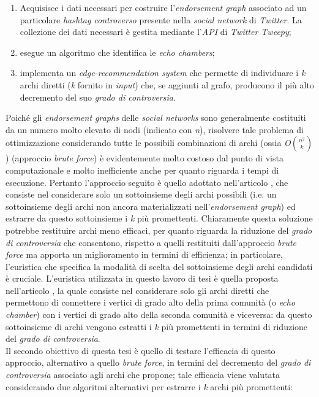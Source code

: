 \documentclass[trieste,12pt]{toptesi}
\begin{document}
\begin{enumerate}
\item Acquisisce i dati necessari per costruire l'\textit{endorsement graph} associato ad un particolare \textit{hashtag controverso} presente nella \textit{social network} di \textit{Twitter}. La collezione dei dati necessari è gestita mediante l'\textit{API} di \textit{Twitter Tweepy};
\item esegue un algoritmo che identifica le \textit{echo chambers};
\item implementa un \textit{edge-recommendation system} che permette di individuare i \textit{k} archi diretti (\textit{k} fornito in \textit{input}) che, se aggiunti al grafo, producono il più alto decremento del suo \textit{grado di controversia}. 
\end{enumerate}
Poiché gli \textit{endorsement graphs} delle \textit{social networks} sono generalmente costituiti da un numero molto elevato di nodi (indicato con \textit{n}), risolvere tale problema di ottimizzazione considerando tutte le possibili combinazioni di archi (ossia \textit{O}${n^2\choose k}$) (approccio \textit{brute force}) è evidentemente molto costoso dal punto di vista computazionale e molto inefficiente anche per quanto riguarda i tempi di esecuzione. Pertanto l'approccio seguito è quello adottato nell'articolo \cite{garimella:paper}, che consiste nel considerare solo un sottoinsieme degli archi possibili (i.e. un sottoinsieme degli archi non ancora materializzati nell'\textit{endorsement graph}) ed estrarre da questo sottoinsieme i \textit{k} più promettenti. Chiaramente questa soluzione potrebbe restituire archi meno efficaci, per quanto riguarda la riduzione del \textit{grado di controversia} che consentono, rispetto a quelli restituiti dall'approccio \textit{brute force} ma apporta un miglioramento in termini di efficienza; in particolare, l'euristica che specifica la modalità di scelta del sottoinsieme degli archi candidati è cruciale. L'euristica utilizzata in questo lavoro di tesi è quella proposta nell'articolo \cite{garimella:paper}, la quale
consiste nel considerare solo gli archi diretti che permettono di connettere i vertici di grado alto della prima comunità (o \textit{echo chamber}) con i vertici di grado alto della seconda comunità e viceversa: da questo sottoinsieme di archi vengono estratti i \textit{k} più promettenti in termini di riduzione del \textit{grado di controversia}.\\Il secondo obiettivo di questa tesi è quello di testare l'efficacia di questo approccio, alternativo a quello \textit{brute force}, in termini del decremento del \textit{grado di controversia} associato agli archi che propone; tale efficacia viene valutata considerando due algoritmi alternativi per estrarre i \textit{k} archi più promettenti: 
\end{document}
